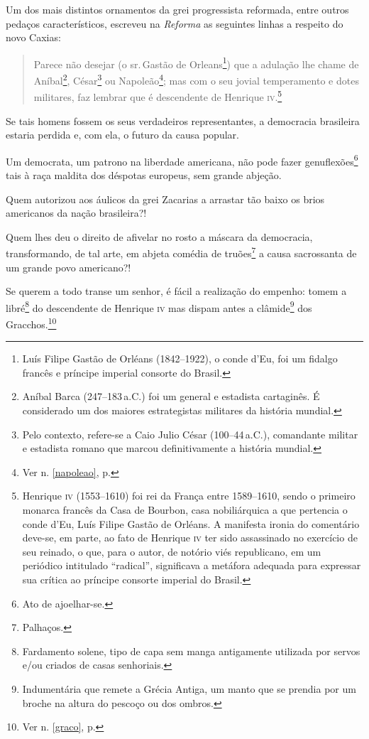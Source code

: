 Um dos mais distintos ornamentos da grei progressista reformada, entre
outros pedaços característicos, escreveu na \emph{Reforma} as seguintes
linhas a respeito do novo Caxias:

\begin{quote}
Parece não desejar (o sr.\,Gastão de Orleans\footnote{Luís Filipe
  Gastão de Orléans (1842--1922), o conde d'Eu, foi um fidalgo francês e
  príncipe imperial consorte do Brasil.}) que a adulação lhe chame de
Aníbal\footnote{Aníbal Barca (247--183\,a.C.) foi um general e estadista
  cartaginês. É considerado um dos maiores estrategistas militares da
  história mundial.}, César\footnote{Pelo contexto, refere-se a Caio
  Julio César (100--44\,a.C.), comandante militar e estadista romano que
  marcou definitivamente a história mundial.} ou Napoleão\footnote{
  Ver n. \ref{napoleao}, p. \pageref{napoleao}}; mas com o seu jovial
temperamento e dotes militares, faz lembrar que é descendente de
Henrique \textsc{iv}.\footnote{Henrique \textsc{iv} (1553--1610) foi rei da França entre
  1589--1610, sendo o primeiro monarca francês da Casa de Bourbon, casa
  nobiliárquica a que pertencia o conde d'Eu, Luís Filipe Gastão de
  Orléans. A manifesta ironia do comentário deve-se, em parte, ao fato
  de Henrique \textsc{iv} ter sido assassinado no exercício de seu reinado, o
  que, para o autor, de notório viés republicano, em um periódico
  intitulado ``radical'', significava a metáfora adequada para expressar
  sua crítica ao príncipe consorte imperial do Brasil.}
\end{quote}  

Se tais homens fossem os seus verdadeiros representantes, a democracia
brasileira estaria perdida e, com ela, o futuro da causa popular.

Um democrata, um patrono na liberdade americana, não pode fazer
genuflexões\footnote{Ato de ajoelhar-se.} tais à raça maldita dos
déspotas europeus, sem grande abjeção.

Quem autorizou aos áulicos da grei Zacarias a arrastar tão baixo os
brios americanos da nação brasileira?!

Quem lhes deu o direito de afivelar no rosto a máscara da democracia,
transformando, de tal arte, em abjeta comédia de truões\footnote{
  Palhaços.} a causa sacrossanta de um grande povo americano?!

Se querem a todo transe um senhor, é fácil a realização do empenho:
tomem a libré\footnote{Fardamento solene, tipo de capa sem manga
  antigamente utilizada por servos e/ou criados de casas senhoriais.} do
descendente de Henrique \textsc{iv} mas dispam antes a clâmide\footnote{
  Indumentária que remete a Grécia Antiga, um manto que se prendia por
  um broche na altura do pescoço ou dos ombros.} dos
Gracchos.\footnote{Ver n. \ref{graco}, p. \pageref{graco}}

